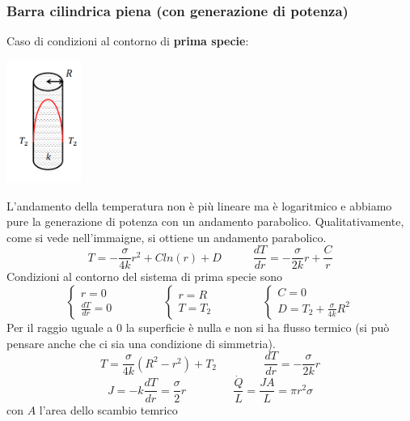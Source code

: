 \subsubsection{Barra cilindrica piena (con generazione di potenza)}
Caso di condizioni al contorno di \textbf{prima specie}:
\begin{center}
    \includegraphics[height=4cm]{../L10/img6.PNG}
\end{center}
L'andamento della temperatura non è più lineare ma è logaritmico e abbiamo pure la generazione di potenza con un andamento parabolico. Qualitativamente, come si vede nell'immaigne, si ottiene un andamento parabolico.
\[
    T= - \frac{\sigma}{4k} r^2 + C ln(r) + D \;\;\;\;\;\;\;\;\;\; \frac{dT}{dr} = - \frac{\sigma}{2k}r + \frac{C}{r}
\]
Condizioni al contorno del sistema di prima specie sono
\[
    \begin{cases}
        r = 0 \\ \frac{dT}{dr} = 0
    \end{cases} \;\;\;\;\;\;\;\;\;\;\;\;\;\;\;  \begin{cases}
        r=R \\ T=T_2 
    \end{cases}\;\;\;\;\;\;\;\;\;\;\;\;\;\;\; \begin{cases}
        C=0 \\ D = T_2 + \frac{\sigma}{4k} R^2
    \end{cases}
\]
Per il raggio uguale a $0$ la superficie è nulla e non si ha flusso termico (si può pensare anche che ci sia una condizione di simmetria).
\[
    T = \frac{\sigma}{4k} (R^2 - r^2) + T_2 \;\;\;\;\;\;\;\;\;\;\;\;\;\;\; \frac{dT}{dr}  = - \frac{\sigma}{2k}r
\]
\[
    J = -k \frac{dT}{dr} = \frac{\sigma}{2} r \;\;\;\;\;\;\;\;\;\;\;\;\;\;\; \frac{\dot{Q}}{L} = \frac{JA}{L} = \pi r^2 \sigma
\]
con $A$ l'area dello scambio temrico
